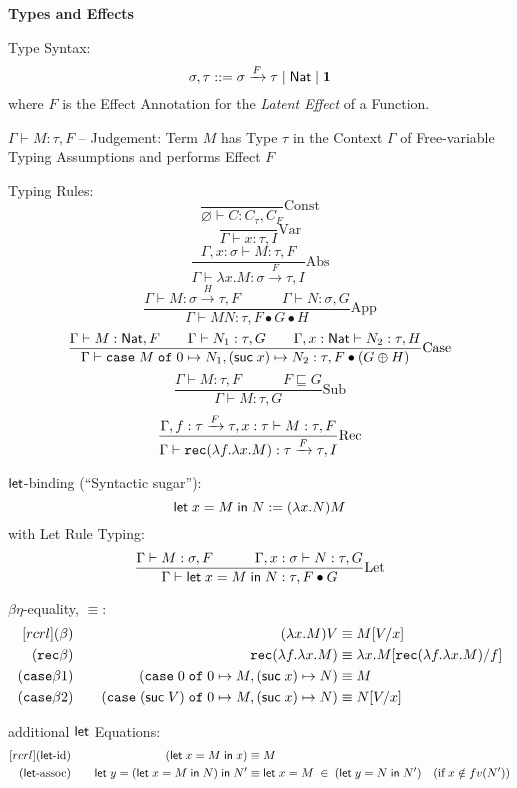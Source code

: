 \textbf{Types and Effects}

Type Syntax:
\[
  \sigma,\tau ::= \sigma \xrightarrow{F} \tau \mid \mathsf{Nat} \mid \mathbf{1}
\]
where $F$ is the Effect Annotation for the \emph{Latent Effect} of a
Function. %

$\Gamma \vdash M:\tau,F$ -- Judgement: Term $M$ has Type $\tau$ in the
Context $\Gamma$ of Free-variable Typing Assumptions and performs
Effect $F$

Typing Rules:
\[
  \frac{}{\varnothing \vdash C : C_\tau,C_F} \mathrm{Const}
\]\[
  \frac{}{\Gamma \vdash x:\tau,I} \mathrm{Var}
\]\[
  \frac{\Gamma, x:\sigma \vdash M:\tau,F}
  {\Gamma \vdash \lambda x.M:\sigma \xrightarrow{F} \tau,I}
  \mathrm{Abs}
\]\[
  \frac{\Gamma \vdash M:\sigma \xrightarrow{H} \tau,F
    \quad\quad\quad \Gamma \vdash N:\sigma,G}
  {\Gamma \vdash M N:\tau, F \bullet G \bullet H}
  \mathrm{App}
\]\[
  \frac{\Gamma \vdash M:\mathsf{Nat},F \quad\quad
    \Gamma \vdash N_1:\tau,G \quad\quad
    \Gamma,x:\mathsf{Nat} \vdash N_2:\tau,H}
  {\Gamma \vdash \mathtt{case}\; M \;\mathtt{of}\; 0 \mapsto N_1,
    (\mathsf{suc}\;x) \mapsto N_2:\tau, F \bullet(G \oplus H)}
  \mathrm{Case}
\]\[
  \frac{\Gamma \vdash M:\tau,F \quad\quad\quad F \sqsubseteq G}
  {\Gamma \vdash M:\tau,G} \mathrm{Sub}
\]\[
  \frac{\Gamma, f:\tau \xrightarrow{F} \tau, x:\tau \vdash M:\tau,F}
  {\Gamma \vdash
    \mathtt{rec}(\lambda f.\lambda x.M):\tau \xrightarrow{F} \tau,I}
  \mathrm{Rec}
\]

$\mathsf{let}$-binding (``Syntactic sugar''):
\[
  \mathsf{let}\; x = M \;\mathsf{in}\; N := (\lambda x.N) M
\]
with Let Rule Typing:
\[
  \frac{\Gamma \vdash M:\sigma,F \quad\quad\quad
    \Gamma,x:\sigma \vdash N:\tau,G}
  {\Gamma \vdash \mathsf{let}\; x = M \;\mathsf{in}\; N:\tau, F \bullet G}
  \mathrm{Let}
\]

$\beta\eta$-equality, $\equiv$:
\[
\begin{aligned}[r c r l]
  (\beta) & \quad & (\lambda x.M) V
    & \equiv M[V/x] \\
  (\rec\beta) & \quad & \rec(\lambda f.\lambda x.M)
    & \equiv \lambda x.M[\rec(\lambda f.\lambda x.M)/f] \\
  (\case\beta1) & \quad & (\case\; 0 \;\of\; 0 \mapsto M,
    (\suc\; x) \mapsto N) & \equiv M \\
  (\case\beta2) & \quad & (\case\; (\suc\; V) \;\of\; 0 \mapsto M,
    (\suc\; x) \mapsto N) & \equiv N[V/x] \\
\end{aligned}
\]

additional $\mathsf{let}$ Equations:
\[
\begin{aligned}[r c r l]
  (\lett\text{-id}) & \quad & (\lett\; x = M \;\inn\; x)
    & \equiv M \\
  (\lett\text{-assoc}) & \quad & \lett\; y =
      (\lett\; x = M \;\inn\; N) \;\inn\; N'
    & \equiv \lett\; x = M \;\in\; (\lett\; y = N \;\inn\; N')
      \quad (\text{if}\; x \notin fv(N'))\\
\end{aligned}
\]



